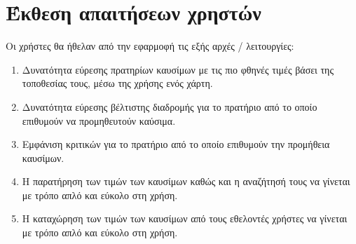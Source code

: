 \section{Έκθεση απαιτήσεων χρηστών}

Οι χρήστες θα ήθελαν από την εφαρμοφή τις εξής αρχές / λειτουργίες:
\begin{enumerate}
	\item Δυνατότητα εύρεσης πρατηρίων καυσίμων με τις πιο φθηνές τιμές βάσει της τοποθεσίας τους, μέσω της χρήσης ενός χάρτη.
	\item Δυνατότητα εύρεσης βέλτιστης διαδρομής για το πρατήριο από το οποίο επιθυμούν να προμηθευτούν καύσιμα.
	\item Εμφάνιση κριτικών για το πρατήριο από το οποίο επιθυμούν την προμήθεια καυσίμων.
	\item Η παρατήρηση των τιμών των καυσίμων καθώς και η αναζήτησή τους να γίνεται με τρόπο απλό και εύκολο στη χρήση.
	\item Η καταχώρηση των τιμών των καυσίμων από τους εθελοντές χρήστες να γίνεται με τρόπο απλό και εύκολο στη χρήση.
\end{enumerate}
